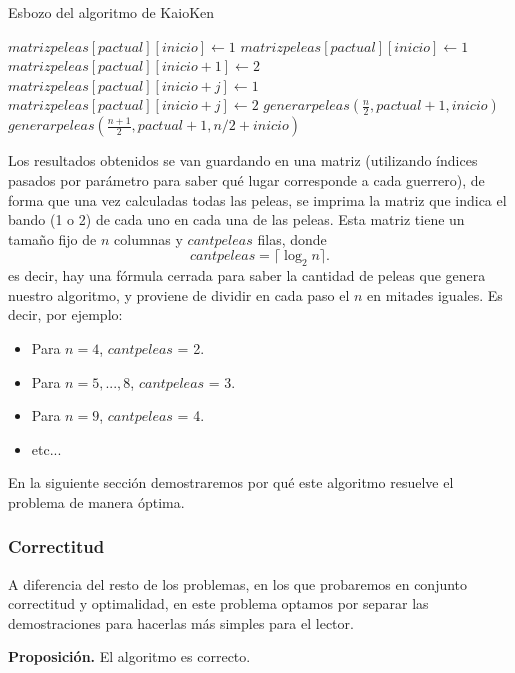 \begin{algorithm}
\begin{algorithmic}
\caption{Esbozo del algoritmo de KaioKen}
    \State $matrizpeleas[pactual][inicio] \gets 1$
  \EndIf
    \State $matrizpeleas[pactual][inicio] \gets 1$
    \State $matrizpeleas[pactual][inicio + 1] \gets 2$
  \Else
    \For {$j \in [0,..., n)$}
        \State $matrizpeleas[pactual][inicio + j] \gets 1$
      \Else 
        \State $matrizpeleas[pactual][inicio + j] \gets 2$
      \EndIf
    \EndFor
    \State $generarpeleas(\frac{n}{2}, pactual+1, inicio)$
    \State $generarpeleas(\frac{n+1}{2}, pactual+1, n/2 + inicio)$
  \EndIf
  \EndProcedure
\end{algorithmic}
\end{algorithm}

Los resultados obtenidos se van guardando en una matriz (utilizando índices pasados por parámetro para saber qué lugar corresponde a cada guerrero), de forma que una vez calculadas todas las peleas, se imprima la matriz que indica el bando (1 o 2) de cada uno en cada una de las peleas. Esta matriz tiene un tamaño fijo de $n$ columnas y $cantpeleas$ filas, donde 
\[ cantpeleas = \lceil \log _2 n \rceil. \]
 es decir, hay una fórmula cerrada para saber la cantidad de peleas que genera nuestro algoritmo, y proviene de dividir en cada paso el $n$ en mitades iguales. Es decir, por ejemplo:
\begin{itemize}
\item Para $n = 4$, $cantpeleas$ = 2.
\item Para $n = 5,...,8$, $cantpeleas$ = 3.
\item Para $n = 9$, $cantpeleas$ = 4.
\item etc...
\end{itemize}
En la siguiente sección demostraremos por qué este algoritmo resuelve el problema de manera óptima.

\subsubsection{Correctitud}

A diferencia del resto de los problemas, en los que probaremos en conjunto correctitud y optimalidad, en este problema optamos por separar las demostraciones para hacerlas más simples para el lector.

\textbf{Proposición.} El algoritmo es correcto.

